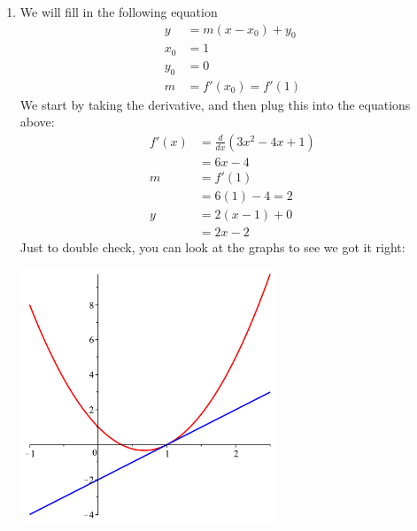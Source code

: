 \documentclass[oneside]{book}
\newcommand{\deriv}[2]{\frac{d#1}{d#2}}
\newcommand{\ddx}{\deriv {}x}
\theoremstyle{definition}
\theoremstyle{solution}
\newtheorem*{solution}{Solution}
\newenvironment{solution}{\vspace{2in}\comment}{\endcomment}
\begin{document}
\begin{solution}
\begin{enumerate}
\item We will fill in the following equation
\begin{align*}
y & = m(x-x_0) + y_0\\
x_0 & = 1\\
y_0 & = 0\\
m & = f'(x_0) = f'(1)
\end{align*}
We start by taking the derivative, and then plug this into the equations above:
\begin{align*}
f' (x) & = \ddx (3x^2-4x+1)\\
    & = 6x-4\\
m & = f'(1)\\
  & = 6(1)-4 = 2\\
y & = 2(x-1)+0\\
  & = 2x-2
\end{align*}
Just to double check, you can look at the graphs to see we got it right:
\begin{center}
\includegraphics[width=3in]{"Quadratic and Tangent Line"}
\end{center}


\end{enumerate}
\end{solution}
\end{document}
